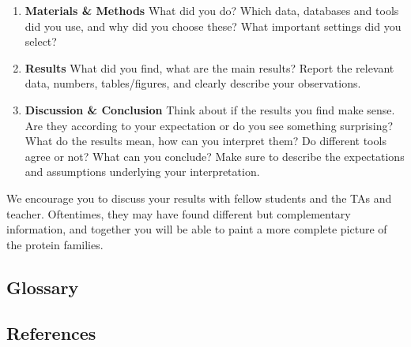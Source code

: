 \begin{framed}
\begin{enumerate}
\item \textbf{Materials \& Methods} What did you do? Which data, databases and tools did you use, and why did you choose these? What important settings did you select?
\item \textbf{Results} What did you find, what are the main results? Report the relevant data, numbers, tables/figures, and clearly describe your observations.
\item \textbf{Discussion \& Conclusion} Think about if the results you find make sense. Are they according to your expectation or do you see something surprising? What do the results mean, how can you interpret them? Do different tools agree or not? What can you conclude? Make sure to describe the expectations and assumptions underlying your interpretation.
\end{enumerate}

We encourage you to discuss your results with fellow students and the TAs and teacher.
Oftentimes, they may have found different but complementary information, and together you will be able to paint a more complete picture of the protein families.
\end{framed}

\subsection{Glossary}

\subsection{References}